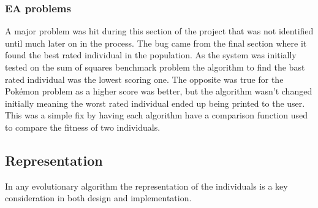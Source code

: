 \documentclass[a4paper]{article}
\newcommand{\Pokemon}{Pok\'{e}mon}
\begin{document}
\subsubsection{EA problems}
\par
A major problem was hit during this section of the project that was not identified until much later on in the process.
The bug came from the final section where it found the best rated individual in the population.
As the system was initially tested on the sum of squares benchmark problem the algorithm to find the bast rated individual was the lowest scoring one.
The opposite was true for the \Pokemon{} problem as a higher score was better, but the algorithm wasn't changed initially meaning the worst rated individual ended up being printed to the user.
This was a simple fix by having each algorithm have a comparison function used to compare the fitness of two individuals.

\subsection{Representation}
In any evolutionary algorithm the representation of the individuals is a key consideration in both design and implementation.
\end{document}
